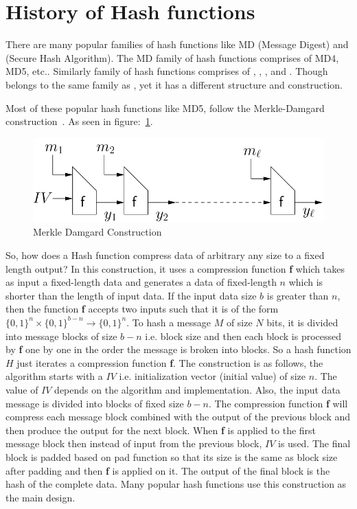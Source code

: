 \section{History of Hash functions}

There are many popular families of hash functions like MD (Message Digest) and \SHA(Secure Hash Algorithm). The MD family of hash functions comprises of MD4, MD5, etc.. Similarly \SHA{} family of hash functions comprises of , , , and .
Though  belongs to the same family as , yet it has a different structure and construction.

Most of these popular hash functions like MD5,  follow the Merkle-Damgard construction~\cite{merkle}. As seen in figure:~\ref{MDConstruction}.

\begin{figure}
    \centering
    \includegraphics[scale=0.5]{MDConstruction.png}
    \caption{Merkle Damgard Construction~\cite{MDamgard}}
    \label{MDConstruction}
\end{figure}

So, how does a Hash function compress data of arbitrary any size to a fixed length output? In this construction, it uses a compression function \textbf{f} which takes as input a fixed-length data and generates a data of fixed-length $n$ which is shorter than the length of input data. If the input data size $b$ is greater than $n$, then the function \textbf{f} accepts two inputs such that it is of the form $\big\{0,1\big\}^n \times \big\{0,1\big\}^{b - n} \rightarrow \big\{0,1\big\}^n$. To hash a message $M$ of size $N$ bits, it is divided into message blocks of size $b-n$ i.e. block size and then each block is processed by \textbf{f} one by one in the order the message is broken into blocks. So a hash function $H$ just iterates a compression function \textbf{f}. The construction is as follows, the algorithm starts with a $IV$ i.e. initialization vector (initial value) of size $n$. The value of $IV$ depends on the algorithm and implementation. Also, the input data message is divided into blocks of fixed size $b-n$.
The compression function \textbf{f} will compress each message block combined with the output of the previous block and then produce the output for the next block. When \textbf{f} is applied to the first message block then instead of input from the previous block, $IV$ is used. The final block is padded based on pad function so that its size is the same as block size after padding and then \textbf{f} is applied on it. The output of the final block is the hash of the complete data. Many popular hash functions use this construction as the main design. 


